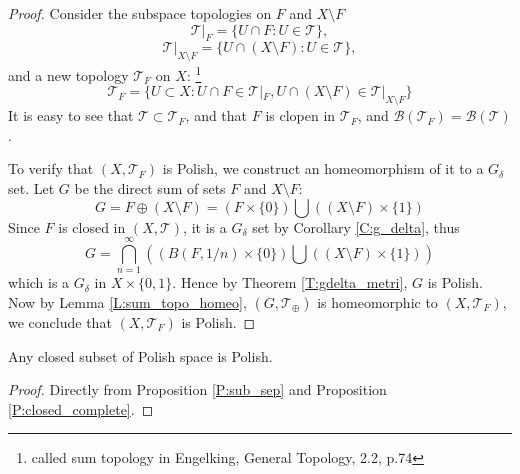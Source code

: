\begin{proof}
Consider the subspace topologies on $F$ and $X\setminus F$
\[
  \mathcal{T}|_F = \{U\cap F: U\in \mathcal{T}\},
\]
\[
  \mathcal{T}|_{X\setminus F} = \{U\cap (X\setminus F): U\in \mathcal{T}\},
\]
and a new topology $\mathcal{T}_F$ on $X$:
\footnote{called sum topology in Engelking, General Topology, 2.2, p.74}
\[
  \mathcal{T}_F = 
    \{ U\subset X: U\cap F \in\mathcal{T}|_F, 
                   U\cap (X\setminus F) \in\mathcal{T}|_{X\setminus F} 
    \}
\]
It is easy to see that $\mathcal{T}\subset\mathcal{T}_F$, and that
$F$ is clopen in $\mathcal{T}_F$, 
and $\mathcal{B}(\mathcal{T}_F)=\mathcal{B}(\mathcal{T})$.

To verify that $(X, \mathcal{T}_F)$ is Polish, we construct an homeomorphism 
of it to a $G_{\delta}$ set. Let $G$ be the direct sum of sets 
$F$ and $X\setminus F$:
\[
  G = F\oplus (X\setminus F)
    = \left( F\times\{0\} \right) \bigcup \left( (X\setminus F) \times \{1\} \right)
\]
Since $F$ is closed in $(X,\mathcal{T})$, it is a $G_{\delta}$ set by
Corollary \ref{C:g_delta}, thus
\[
  G = \bigcap_{n=1}^{\infty}
      \left(
        (B(F,{1/n})\times\{0\}) \bigcup ((X\setminus F) \times \{1\})
      \right)
\]
which is a $G_{\delta}$ in $X\times\{0,1\}$. Hence by Theorem 
\ref{T:gdelta_metri}, $G$ is Polish. Now by Lemma \ref{L:sum_topo_homeo},
$(G,\mathcal{T}_{\oplus})$ is homeomorphic to $(X,\mathcal{T}_F)$, we conclude
that $(X,\mathcal{T}_F)$ is Polish.
\end{proof}

\begin{corollary} \label{C:clos_polish}
Any closed subset of Polish space is Polish.
\end{corollary}
\begin{proof}
Directly from Proposition \ref{P:sub_sep} and Proposition 
\ref{P:closed_complete}.
\end{proof}

